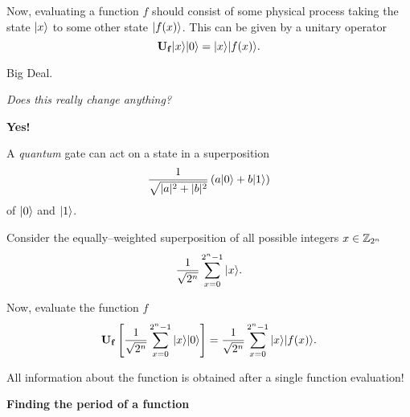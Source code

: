 \documentclass{slides}
\begin{document}
Now, evaluating a function $f$ should consist of some physical
process taking the state ${|{x}\rangle}$ to some
other state ${|{f(x)}\rangle}$.  This can be given by a unitary
operator
\begin{equation*}
{\bf U_f}{|{x}\rangle}{|{0}\rangle} = {|{x}\rangle}{|{f(x)}\rangle}.
\end{equation*}

\begin{center}
Big Deal.  

{\sl Does this really change anything?}
\end{center}

\pagebreak

\begin{center}
{\bf Yes!}
\end{center}

%

A \emph{quantum} gate can act on a state in a superposition
\begin{equation*}
\frac{1}{\sqrt{|a|^2+|b|^2}}\left(a{|{0}\rangle}+b{|{1}\rangle}\right)
\end{equation*}
of ${|{0}\rangle}$
and ${|{1}\rangle}$.

Consider the equally--weighted superposition of all possible 
integers $x\in {\mathbb{Z}}_{2^n}$
\begin{equation*}
\frac{1}{\sqrt{2^n}}\sum_{x=0}^{2^n-1} {|{x}\rangle}.
\end{equation*}

Now, evaluate the function $f$
\begin{equation*}
{\bf U_f} \left\lbrack
\frac{1}{\sqrt{2^n}}\sum_{x=0}^{2^n-1}{|{x}\rangle}{|{0}\rangle}
\right\rbrack
= 
\frac{1}{\sqrt{2^n}}\sum_{x=0}^{2^n-1}{|{x}\rangle}{|{f(x)}\rangle}.
\end{equation*}

All information about the function is obtained after a single
function evaluation!

\pagebreak

\begin{center}
\textbf{Finding the period of a function}
\end{center}
\end{document}
